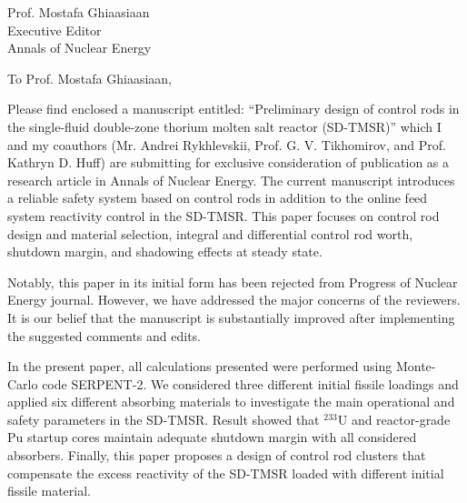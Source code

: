 \documentclass[11pt]{letter} %
\newcommand{\RecipientName}{Prof. Mostafa Ghiaasiaan\xspace}
\newcommand{\RecipientAddress}{Executive Editor\\Annals of Nuclear Energy}
\begin{document}
	
	
	
	\begin{letter}{\RecipientName\\
			\RecipientAddress\xspace}
		
		\address{O. Ashraf\\
			oabdelaziz@mephi.ru\\
			osama.ashraf@edu.asu.edu.eg\\
			Institute of Nuc. Physics and Eng.\\
			National Research Nuclear University\\
			Moscow, Russia, 115409}
		
		
		\opening{To \RecipientName,}
		
		Please find enclosed a manuscript entitled: ``Preliminary design of control rods in the single-fluid double-zone thorium molten salt reactor (SD-TMSR)'' which I and my coauthors (Mr. Andrei Rykhlevskii, Prof. G. V. Tikhomirov, and Prof. Kathryn D. Huff) are submitting for exclusive consideration of publication as a research article in Annals of Nuclear Energy. The current manuscript introduces a reliable safety system based on control rods in addition to the online feed system reactivity control in the SD-TMSR. This paper focuses on control rod design and material selection, integral and differential control rod worth, shutdown margin, and shadowing effects at steady state.
		
		Notably, this paper in its initial form has been rejected from Progress of Nuclear Energy journal. However, we have addressed the major concerns of the reviewers. It is our belief that the manuscript is substantially improved after implementing the suggested comments and edits.
		
		In the present paper, all calculations presented were performed using Monte-Carlo code SERPENT-2. We considered three different initial fissile loadings and applied six different absorbing materials to investigate the main operational and safety parameters in the SD-TMSR. Result showed that $^{233}$U and reactor-grade Pu startup cores maintain adequate shutdown margin with all considered absorbers. Finally, this paper proposes a design of control rod clusters that compensate the excess reactivity of the SD-TMSR loaded with different initial fissile material.
		

\end{letter}
\end{document}
